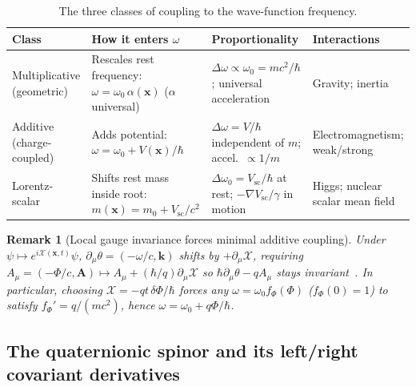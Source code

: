 \documentclass[aps,prd,onecolumn,tightenlines,nofootinbib,notitlepage,10pt,floatfix]{revtex4-2}
\theoremstyle{indentedtheorem}
\newtheorem{remark}{Remark}
\begin{document}
\begin{table}[htbp]
\centering
\footnotesize
\caption{The three classes of coupling to the wave-function frequency.}
\label{tab:classes}
\begin{tabular}{p{2.7cm}p{4.6cm}p{3.9cm}p{3.3cm}}
\toprule
\textbf{Class} & \textbf{How it enters $\omega$} & \textbf{Proportionality} & \textbf{Interactions} \\
\midrule
Multiplicative (geometric) & Rescales rest frequency: $\omega=\omega_0\,\alpha(\mathbf{x})$ ($\alpha$ universal) & $\Delta\omega\propto\omega_0=mc^2/\hbar$; universal acceleration & Gravity; inertia \\
Additive (charge-coupled) & Adds potential: $\omega=\omega_0+V(\mathbf{x})/\hbar$ & $\Delta\omega=V/\hbar$ independent of $m$; accel.\ $\propto 1/m$ & Electromagnetism; weak/strong \\
Lorentz-scalar & Shifts rest mass inside root: $m(\mathbf{x})=m_0+V_\text{sc}/c^2$ & $\Delta\omega_0=V_\text{sc}/\hbar$ at rest; $-\nabla V_\text{sc}/\gamma$ in motion & Higgs; nuclear scalar mean field \\
\bottomrule
\end{tabular}
\end{table}

\begin{remark}[Local gauge invariance forces minimal additive coupling]\label{rem:additivity}
Under $\psi\mapsto e^{i\mathcal{X}(\mathbf{x},t)}\psi$, $\partial_\mu\theta=(-\omega/c,\mathbf{k})$ shifts by $+\partial_\mu\mathcal{X}$, requiring $A_\mu=(-\Phi/c,\mathbf{A})\mapsto A_\mu+(\hbar/q)\partial_\mu\mathcal{X}$ so $\hbar\partial_\mu\theta-qA_\mu$ stays invariant~\citep{Weyl1929Elektron,Yang1954Conservation}. In particular, choosing $\mathcal{X}=-qt\,\delta\Phi/\hbar$ forces any $\omega=\omega_0 f_\Phi(\Phi)$ ($f_\Phi(0)=1$) to satisfy $f_\Phi'=q/(mc^2)$, hence $\omega=\omega_0+q\Phi/\hbar$.
\end{remark}

\subsection{The quaternionic spinor and its left/right covariant derivatives}
\label{sec:spinor}
\end{document}
